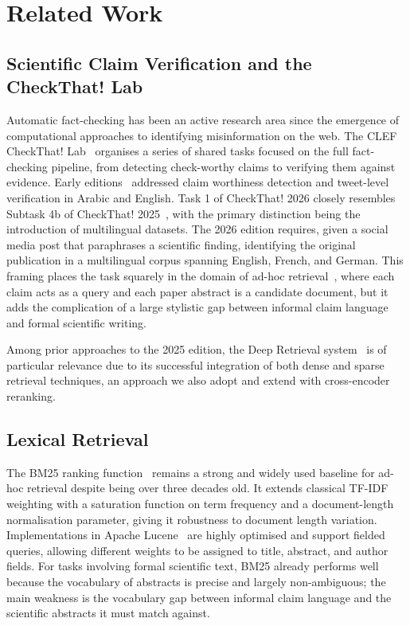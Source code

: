 \section{Related Work}
\label{sec:related-work}

\subsection{Scientific Claim Verification and the CheckThat! Lab}

Automatic fact-checking has been an active research area since the emergence of computational approaches to identifying misinformation on the web. The CLEF CheckThat! Lab~\citep{checkthat2026} organises a series of shared tasks focused on the full fact-checking pipeline, from detecting check-worthy claims to verifying them against evidence. Early editions~\citep{ElsayedEtAl2019,BarronCedenoEtAl2020,NakovEtAl2021} addressed claim worthiness detection and tweet-level verification in Arabic and English. Task 1 of CheckThat! 2026 closely resembles Subtask 4b of CheckThat! 2025~\citep{OverviewCheckthat2025task4b}, with the primary distinction being the introduction of multilingual datasets. The 2026 edition requires, given a social media post that paraphrases a scientific finding, identifying the original publication in a multilingual corpus spanning English, French, and German. This framing places the task squarely in the domain of ad-hoc retrieval~\citep{ManningEtAl2008}, where each claim acts as a query and each paper abstract is a candidate document, but it adds the complication of a large stylistic gap between informal claim language and formal scientific writing.

Among prior approaches to the 2025 edition, the Deep Retrieval system~\citep{deepRetrieval} is of particular relevance due to its successful integration of both dense and sparse retrieval techniques, an approach we also adopt and extend with cross-encoder reranking.

\subsection{Lexical Retrieval}

The BM25 ranking function~\citep{RobertsonZaragoza2009} remains a strong and widely used baseline for ad-hoc retrieval despite being over three decades old. It extends classical TF-IDF weighting with a saturation function on term frequency and a document-length normalisation parameter, giving it robustness to document length variation. Implementations in Apache Lucene~\citep{McCandlessEtAl2010} are highly optimised and support fielded queries, allowing different weights to be assigned to title, abstract, and author fields. For tasks involving formal scientific text, BM25 already performs well because the vocabulary of abstracts is precise and largely non-ambiguous; the main weakness is the vocabulary gap between informal claim language and the scientific abstracts it must match against.

